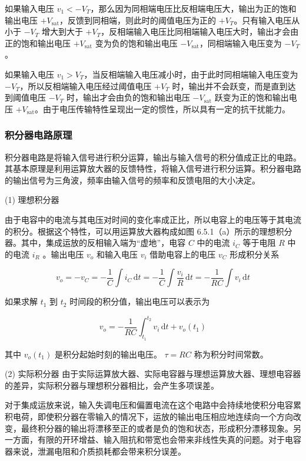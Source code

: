 \documentclass[10pt, a4paper]{article} %
\begin{document}
如果输入电压 $v_1 < -V_T$，那么因为同相端电压比反相端电压大，输出为正的饱和输出电压 $+V_{\text{sat}}$，反馈到同相端，则此时的阈值电压为正的 $+V_T$。只有输入电压从小于 $-V_T$ 增大到大于 $+V_T$，反相端输入电压比同相端输入电压大时，输出才会由正的饱和输出电压 $+V_{\text{sat}}$ 变为负的饱和输出电压 $-V_{\text{sat}}$，同相端输入电压变为 $-V_T$。

如果输入电压 $v_1 > V_T$，当反相端输入电压减小时，由于此时同相端输入电压变为 $-V_T$，所以反相端输入电压经过阈值电压 $+V_T$ 时，输出并不会跃变，而是直到达到阈值电压 $-V_T$ 时，输出才会由负的饱和输出电压 $-V_{\text{sat}}$ 跃变为正的饱和输出电压 $+V_{\text{sat}}$。由于电压传输特性呈现出一定的惯性，所以具有一定的抗干扰能力。

\subsubsection{积分器电路原理}
积分器电路是将输入信号进行积分运算，输出与输入信号的积分值成正比的电路。其基本原理是利用运算放大器的反馈特性，将输入信号进行积分运算。积分器电路的输出信号为三角波，频率由输入信号的频率和反馈电阻的大小决定。

(1) 理想积分器

由于电容中的电流与其电压对时间的变化率成正比，所以电容上的电压等于其电流的积分。根据这个特性，可以用运算放大器构成如图 6.5.1（a）所示的理想积分器。其中，集成运放的反相输入端为“虚地”，电容  $ C $  中的电流  $ i_C $  等于电阻  $ R $  中的电流  $ i_R $ 。输出电压  $ v_o $  和输入电压  $ v_i $  借助电容上的电压  $ v_C $  形成积分关系


 $$
v_o = -v_C = -\frac{1}{C} \int i_C \, \mathrm{d}t = -\frac{1}{C} \int \frac{v_i}{R} \, \mathrm{d}t = -\frac{1}{RC} \int v_i \, \mathrm{d}t
$$ 

如果求解  $ t_1 $  到  $ t_2 $  时间段的积分值，输出电压可以表示为


 $$
v_o = -\frac{1}{RC} \int_{t_1}^{t_2} v_i \, \mathrm{d}t + v_o(t_1)
$$ 

其中  $ v_o(t_1) $  是积分起始时刻的输出电压。 $ \tau = RC $  称为积分时间常数。

(2) 实际积分器
由于实际运算放大器、实际电容器与理想运算放大器、理想电容器的差异，实际积分器与理想积分器相比，会产生多项误差。

对于集成运放来说，输入失调电压和偏置电流在这个电路中会持续地使积分电容累积电荷，即使积分器在零输入的情况下，运放的输出电压相应地连续向一个方向改变，最终积分器的输出将漂移至正的或者是负的饱和状态，形成积分漂移现象。另一方面，有限的开环增益、输入阻抗和带宽也会带来非线性失真的问题。对于电容器来说，泄漏电阻和介质损耗都会带来积分误差。
\end{document}

